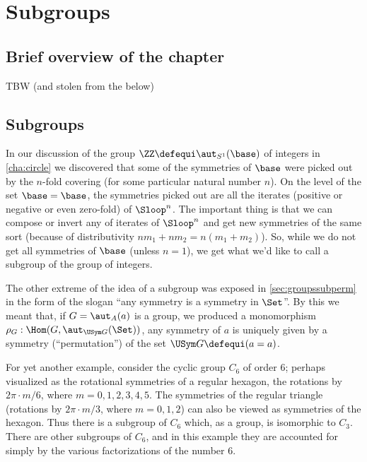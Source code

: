 \chapter{Subgroups}
\label{ch:subgroups}


\section{Brief overview of the chapter}
\label{sec:subgp-overview}

TBW (and stolen from the below)

\section{Subgroups}
\label{sec:subgroups}
In our discussion of the group $\ZZ\defequi\aut_{S^1}(\base)$ of integers in \cref{cha:circle} we discovered that some of the symmetries of $\base$ were picked out by the $n$-fold covering (for some particular natural number $n$).  On the level of the set $\base=\base$, the symmetries picked out are all the iterates (positive or negative or even zero-fold) of $\Sloop^n$.  The important thing is that we can compose or invert any of iterates of $\Sloop^n$ and get new symmetries of the same sort (because of distributivity $nm_1+nm_2=n(m_1+m_2)$).  So, while we do not get all symmetries of $\base$ (unless $n=1$), we get what we'd like to call a subgroup of the group of integers. 



The other extreme of the idea of a subgroup was exposed in \cref{sec:groupssubperm} in the form of the slogan ``any symmetry is a symmetry in $\Set$''.
By this we meant that, if $G=\aut_A(a)$ is a group, we produced a monomorphism $\rho_G:\Hom(G,\aut_{\USym G}(\Set))$, \ie any symmetry of $a$ is uniquely given by a symmetry (``permutation'') of the set $\USym G\defequi (a=a)$.

For yet another example, consider the cyclic group $C_6$ of order $6$; perhaps visualized as the rotational symmetries of a regular hexagon,  \ie the rotations by $2\pi\cdot m /6$, where $m=0,1,2,3,4,5$.
The symmetries of the regular triangle (rotations by $2\pi\cdot m/3$, where $m=0,1,2$) can also be viewed as symmetries of the hexagon.  Thus there is a subgroup of $C_6$ which, as a group, is isomorphic to $C_3$.
There are other subgroups of $C_6$, and in this example they are accounted for simply by the various factorizations of the number $6$.  

